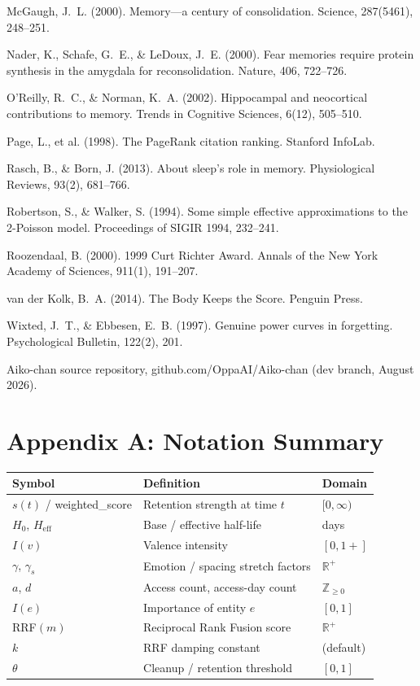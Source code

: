 \documentclass[]{article}
\begin{document}
McGaugh, J.\ L. (2000). Memory---a century of consolidation. Science,
287(5461), 248--251.

Nader, K., Schafe, G.\ E., \& LeDoux, J.\ E. (2000). Fear memories require
protein synthesis in the amygdala for reconsolidation. Nature, 406, 722--726.

O'Reilly, R.\ C., \& Norman, K.\ A. (2002). Hippocampal and neocortical
contributions to memory. Trends in Cognitive Sciences, 6(12), 505--510.

Page, L., et al. (1998). The PageRank citation ranking. Stanford InfoLab.

Rasch, B., \& Born, J. (2013). About sleep's role in memory. Physiological
Reviews, 93(2), 681--766.

Robertson, S., \& Walker, S. (1994). Some simple effective approximations
to the 2-Poisson model. Proceedings of SIGIR 1994, 232--241.

Roozendaal, B. (2000). 1999 Curt Richter Award. Annals of the New York
Academy of Sciences, 911(1), 191--207.

van der Kolk, B.\ A. (2014). The Body Keeps the Score. Penguin Press.

Wixted, J.\ T., \& Ebbesen, E.\ B. (1997). Genuine power curves in forgetting.
Psychological Bulletin, 122(2), 201.

Aiko-chan source repository, github.com/OppaAI/Aiko-chan (dev branch,
August 2026).

\hypertarget{appendix-a-notation-summary}{%
\section{\texorpdfstring{\textbf{Appendix A: Notation
Summary}}{Appendix A: Notation Summary}}\label{appendix-a-notation-summary}}

\begin{longtable}[]{@{}
  >{\raggedright\arraybackslash}p{}
  >{\raggedright\arraybackslash}p{}
  >{\raggedright\arraybackslash}p{}@{}}
\toprule\noalign{}
\textbf{Symbol} & \textbf{Definition} & \textbf{Domain} \\
\midrule\noalign{}
\endhead
\bottomrule\noalign{}
\endlastfoot
\(s(t)\) / weighted\_score & Retention strength at time \(t\) & \([0,\infty)\) \\
\(H_0\), \(H_{\text{eff}}\) & Base / effective half-life & days \\
\(I(v)\) & Valence intensity & \([0,1+]\) \\
\(\gamma\), \(\gamma_s\) & Emotion / spacing stretch factors & \(\mathbb{R}^+\) \\
\(a\), \(d\) & Access count, access-day count & \(\mathbb{Z}_{\ge0}\) \\
\(I(e)\) & Importance of entity \(e\) & \([0,1]\) \\
RRF\((m)\) & Reciprocal Rank Fusion score & \(\mathbb{R}^+\) \\
\(k\) & RRF damping constant & 60 (default) \\
\(\theta\) & Cleanup / retention threshold & \([0,1]\) \\
\end{longtable}
\end{document}
